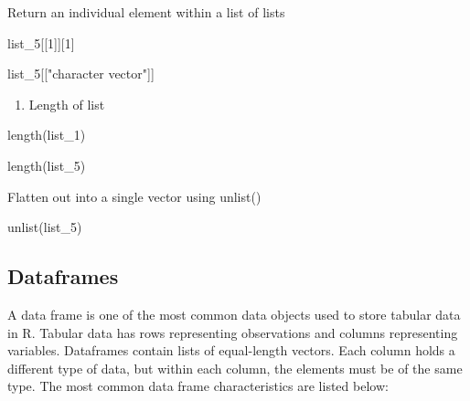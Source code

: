 \documentclass[
  letterpaper,
  DIV=11,
  numbers=noendperiod]{scrreprt}
\newenvironment{Shaded}{}{}
\newcommand{\DecValTok}[1]{\textcolor[rgb]{0.00,0.36,0.77}{#1}}
\newcommand{\FunctionTok}[1]{\textcolor[rgb]{0.44,0.26,0.76}{#1}}
\newcommand{\NormalTok}[1]{\textcolor[rgb]{0.14,0.16,0.18}{#1}}
\newcommand{\StringTok}[1]{\textcolor[rgb]{0.01,0.18,0.38}{#1}}
\providecommand{\tightlist}{%
  \setlength{\itemsep}{0pt}\setlength{\parskip}{0pt}}\usepackage{longtable,booktabs,array}
\begin{document}
Return an individual element within a list of lists

\begin{Shaded}
\begin{Highlighting}[]
\NormalTok{list\_5[[}\DecValTok{1}\NormalTok{]][}\DecValTok{1}\NormalTok{]}
\end{Highlighting}
\end{Shaded}

\begin{Shaded}
\begin{Highlighting}[]
\NormalTok{list\_5[[}\StringTok{"character vector"}\NormalTok{]]}
\end{Highlighting}
\end{Shaded}

\begin{enumerate}
\def\labelenumi{\alph{enumi}.}
\setcounter{enumi}{7}
\tightlist
\item
  Length of list
\end{enumerate}

\begin{Shaded}
\begin{Highlighting}[]
\FunctionTok{length}\NormalTok{(list\_1)}
\end{Highlighting}
\end{Shaded}

\begin{Shaded}
\begin{Highlighting}[]
\FunctionTok{length}\NormalTok{(list\_5)}
\end{Highlighting}
\end{Shaded}

Flatten out into a single vector using unlist()

\begin{Shaded}
\begin{Highlighting}[]
\FunctionTok{unlist}\NormalTok{(list\_5)}
\end{Highlighting}
\end{Shaded}

\subsection{Dataframes}\label{dataframes}

A data frame is one of the most common data objects used to store
tabular data in R. Tabular data has rows representing observations and
columns representing variables. Dataframes contain lists of equal-length
vectors. Each column holds a different type of data, but within each
column, the elements must be of the same type. The most common data
frame characteristics are listed below:
\end{document}
